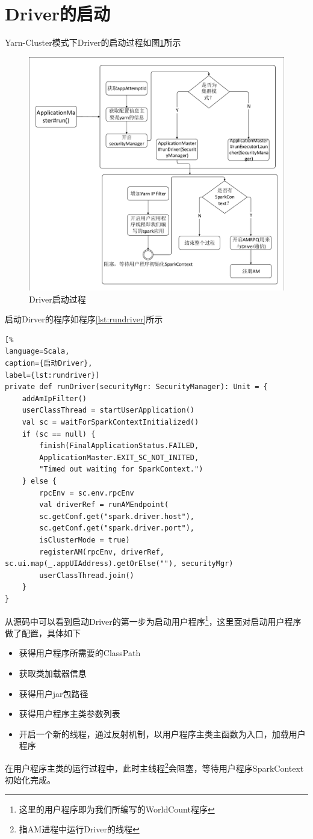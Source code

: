 \section{Driver的启动}
Yarn-Cluster模式下Driver的启动过程如图\ref{fig:startDriver}所示
\begin{figure}[H]
	\centering
		\includegraphics[width=\textwidth]{figures/startDriver.pdf}
	\caption{Driver启动过程}
	\label{fig:startDriver}
\end{figure}

启动Dirver的程序如程序\ref{lst:rundriver}所示
\begin{lstlisting}[%
language=Scala,
caption={启动Driver},
label={lst:rundriver}]
private def runDriver(securityMgr: SecurityManager): Unit = {
    addAmIpFilter()
    userClassThread = startUserApplication()
    val sc = waitForSparkContextInitialized()
    if (sc == null) {
        finish(FinalApplicationStatus.FAILED,
        ApplicationMaster.EXIT_SC_NOT_INITED,
        "Timed out waiting for SparkContext.")
    } else {
        rpcEnv = sc.env.rpcEnv
        val driverRef = runAMEndpoint(
        sc.getConf.get("spark.driver.host"),
		sc.getConf.get("spark.driver.port"),
		isClusterMode = true)
		registerAM(rpcEnv, driverRef, sc.ui.map(_.appUIAddress).getOrElse(""), securityMgr)
		userClassThread.join()
	}
}
\end{lstlisting}

从源码中可以看到启动Driver的第一步为启动用户程序\footnote{这里的用户程序即为我们所编写的WorldCount程序}，这里面对启动用户程序做了配置，具体如下
\begin{itemize}
	\item 获得用户程序所需要的ClassPath
	\item 获取类加载器信息
	\item 获得用户jar包路径
	\item 获得用户程序主类参数列表
	\item 开启一个新的线程，通过反射机制，以用户程序主类主函数为入口，加载用户程序
\end{itemize}

在用户程序主类的运行过程中，此时主线程\footnote{指AM进程中运行Driver的线程}会阻塞，等待用户程序SparkContext初始化完成。